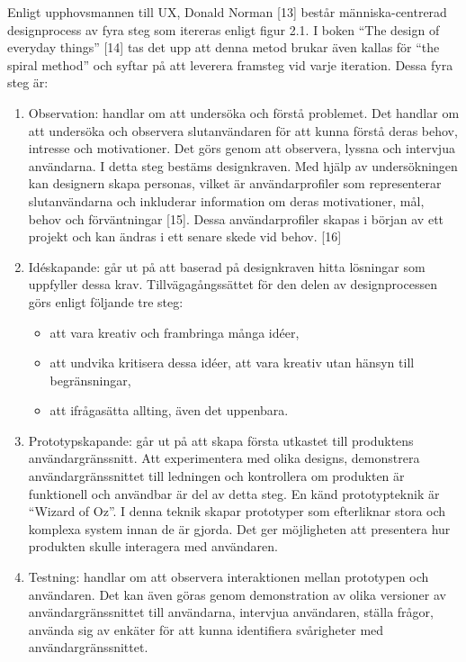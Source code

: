 \documentclass[12pt]{kththesis}
\begin{document}
Enligt upphovsmannen till UX, Donald Norman [13] består människa-centrerad designprocess av fyra steg som itereras enligt figur 2.1. I boken “The design of everyday things” [14] tas det upp att denna metod brukar även kallas för “the spiral method” och syftar på att leverera framsteg vid varje iteration. Dessa fyra steg är: 

\begin{enumerate}
\item Observation: handlar om att undersöka och förstå problemet. Det handlar om att undersöka och observera slutanvändaren för att kunna förstå deras behov, intresse och motivationer. Det görs genom att observera, lyssna och intervjua användarna. I detta steg bestäms designkraven. Med hjälp av undersökningen kan designern skapa personas, vilket är användarprofiler som representerar slutanvändarna och inkluderar information om deras motivationer, mål, behov och förväntningar [15]. Dessa användarprofiler skapas i början av ett projekt och kan ändras i ett senare skede vid behov. [16]

\item Idéskapande: går ut på att baserad på designkraven hitta lösningar som uppfyller dessa krav. Tillvägagångssättet för den delen av designprocessen görs enligt följande tre steg:
\begin{itemize}
\item att vara kreativ och frambringa många idéer,
\item att undvika kritisera dessa idéer, att vara kreativ utan hänsyn till begränsningar,
\item att ifrågasätta allting, även det uppenbara. 
\end{itemize}

\item Prototypskapande: går ut på att skapa första utkastet till produktens användargränssnitt. Att experimentera med olika designs, demonstrera användargränssnittet till ledningen och kontrollera om produkten är funktionell och användbar är del av detta steg. En känd prototypteknik är “Wizard of Oz”. I denna teknik skapar prototyper som efterliknar stora och komplexa system innan de är gjorda. Det ger möjligheten att presentera hur produkten skulle interagera med användaren. 

\item Testning: handlar om att observera interaktionen mellan prototypen och användaren. Det kan även göras genom demonstration av olika versioner av användargränssnittet till användarna, intervjua användaren, ställa frågor, använda sig av enkäter för att kunna identifiera svårigheter med användargränssnittet.
 
\end{enumerate}
\end{document}
